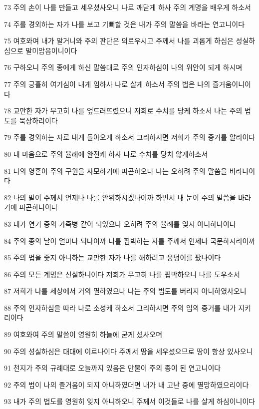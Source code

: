 \par 73 주의 손이 나를 만들고 세우셨사오니 나로 깨닫게 하사 주의 계명을 배우게 하소서
\par 74 주를 경외하는 자가 나를 보고 기뻐할 것은 내가 주의 말씀을 바라는 연고니이다
\par 75 여호와여 내가 알거니와 주의 판단은 의로우시고 주께서 나를 괴롭게 하심은 성실하심으로 말미암음이니이다
\par 76 구하오니 주의 종에게 하신 말씀대로 주의 인자하심이 나의 위안이 되게 하시며
\par 77 주의 긍휼히 여기심이 내게 임하사 나로 살게 하소서 주의 법은 나의 즐거움이니이다
\par 78 교만한 자가 무고히 나를 엎드러뜨렸으니 저희로 수치를 당케 하소서 나는 주의 법도를 묵상하리이다
\par 79 주를 경외하는 자로 내게 돌아오게 하소서 그리하시면 저희가 주의 증거를 알리이다
\par 80 내 마음으로 주의 율례에 완전케 하사 나로 수치를 당치 않게하소서
\par 81 나의 영혼이 주의 구원을 사모하기에 피곤하오나 나는 오히려 주의 말씀을 바라나이다
\par 82 나의 말이 주께서 언제나 나를 안위하시겠나이까 하면서 내 눈이 주의 말씀을 바라기에 피곤하니이다
\par 83 내가 연기 중의 가죽병 같이 되었으나 오히려 주의 율례를 잊지 아니하나이다
\par 84 주의 종의 날이 얼마나 되나이까 나를 핍박하는 자를 주께서 언제나 국문하시리이까
\par 85 주의 법을 좇지 아니하는 교만한 자가 나를 해하려고 웅덩이를 팠나이다
\par 86 주의 모든 계명은 신실하니이다 저희가 무고히 나를 핍박하오니 나를 도우소서
\par 87 저희가 나를 세상에서 거의 멸하였으나 나는 주의 법도를 버리지 아니하였사오니
\par 88 주의 인자하심을 따라 나로 소성케 하소서 그리하시면 주의 입의 증거를 내가 지키리이다
\par 89 여호와여 주의 말씀이 영원히 하늘에 굳게 섰사오며
\par 90 주의 성실하심은 대대에 이르나이다 주께서 땅을 세우셨으므로 땅이 항상 있사오니
\par 91 천지가 주의 규례대로 오늘까지 있음은 만물이 주의 종이 된 연고니이다
\par 92 주의 법이 나의 즐거움이 되지 아니하였더면 내가 내 고난 중에 멸망하였으리이다
\par 93 내가 주의 법도를 영원히 잊지 아니하오니 주께서 이것들로 나를 살게 하심이니이다
